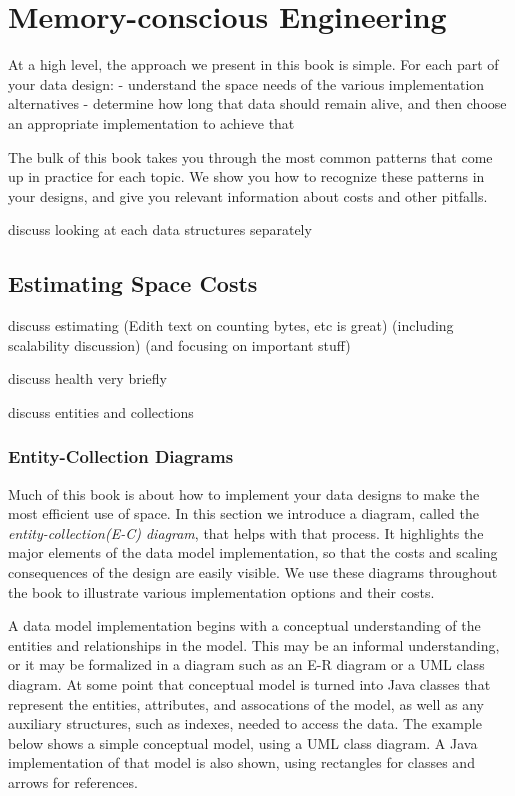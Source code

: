 \section{Memory-conscious Engineering}

At a high level, the approach we present in this book is simple. For each part of your data design:
- understand the space needs of the various implementation alternatives
- determine how long that data should remain alive, and then choose an appropriate implementation to achieve that

The bulk of this book takes you through the most common patterns that come up in practice for each topic. We show you how to recognize
these patterns in your designs, and give you relevant information about costs and other pitfalls.  

discuss looking at each data structures separately

\subsection{Estimating Space Costs}

discuss estimating (Edith text on counting bytes, etc is great) (including
scalability discussion) (and focusing on important stuff)

discuss health very briefly

discuss entities and collections

\subsubsection{Entity-Collection Diagrams}

Much of this book is about how to implement your data designs to make the most efficient use of space. In this section we introduce a diagram, called the \emph{entity-collection(E-C) diagram}, that helps with that process. It highlights the major elements of the data model implementation, so that the costs and scaling consequences of the design are easily visible. We use these diagrams throughout the book to illustrate various implementation options and their costs.

A data model implementation begins with a conceptual understanding of the entities and relationships in the model.  This may be an informal understanding, or it may be formalized in a diagram such as an E-R diagram or a UML class diagram.  At some point that conceptual model is turned into Java classes that represent the entities, attributes, and assocations of the model, as well as any auxiliary structures, such as indexes, needed to access the data.  The example below shows a simple conceptual model, using a UML class diagram.  A Java implementation of that model is also shown, using rectangles for classes and arrows for references.  %


